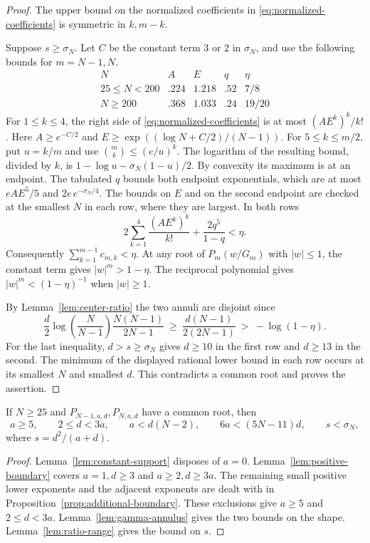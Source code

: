 \begin{proof}
The upper bound on the
normalized coefficients in \eqref{eq:normalized-coefficients}
is symmetric in \(k,m-k\).

Suppose \(s\ge\sigma_N\). Let \(C\) be the constant term \(3\) or \(2\)
in \(\sigma_N\), and use the following bounds for \(m=N-1,N\).
\[
\begin{array}{c|cccc}
 N&A&E&q&\eta\\ \hline
 25\le N<200&.224&1.218&.52&7/8\\
 N\ge200&.368&1.033&.24&19/20
\end{array}
\]
For \(1\le k\le4\), the right side of
\eqref{eq:normalized-coefficients} is at most
\((AE^k)^k/k!\). Here \(A\ge e^{-C/2}\) and
\(E\ge\exp((\log N+C/2)/(N-1))\).
For \(5\le k\le m/2\), put \(u=k/m\) and use
\(\binom mk\le(e/u)^k\). The logarithm of the resulting bound,
divided by \(k\), is \(1-\log u-\sigma_N(1-u)/2\).
By convexity its maximum is at an endpoint.
The tabulated \(q\) bounds both endpoint exponentials, which
are at most \(eAE^5/5\) and \(2e\,e^{-\sigma_N/4}\).
The bounds on \(E\) and on the second endpoint are checked
at the smallest \(N\) in each row, where they are largest.
In both rows
\[
 2\sum_{k=1}^{4}\frac{(AE^k)^k}{k!}+\frac{2q^5}{1-q}<\eta .
\]
Consequently \(\sum_{k=1}^{m-1}c_{m,k}<\eta\). At any root
of \(P_m(w/G_m)\) with \(|w|\le1\), the constant term gives
\(|w|^m>1-\eta\). The reciprocal polynomial gives
\(|w|^m<(1-\eta)^{-1}\) when \(|w|\ge1\).

By Lemma~\ref{lem:center-ratio} the two annuli are disjoint since
\[
 \frac d2\log\!\left(\frac N{N-1}\right)
              \frac{N(N-1)}{2N-1}
 \ \ge\ \frac{d(N-1)}{2(2N-1)}
 \ >\ -\log(1-\eta).
\]
For the last inequality, \(d>s\ge\sigma_N\) gives \(d\ge10\)
in the first row and \(d\ge13\) in the second. The minimum
of the displayed rational lower bound in each row occurs at
its smallest \(N\) and smallest \(d\). This contradicts
a common root and proves the assertion.
\end{proof}


\begin{lemma}
\label{lem:support-reduction}
If \(N\ge25\) and \(P_{N-1,a,d},P_{N,a,d}\) have a common root, then
\[
 a\ge5,\qquad 2\le d<3a,\qquad
 a<d(N-2),\qquad 6a<(5N-11)d,\qquad
 s<\sigma_N,
\]
where \(s=d^2/(a+d)\).
\end{lemma}

\begin{proof}
Lemma~\ref{lem:constant-support} disposes of \(a=0\).
Lemma~\ref{lem:positive-boundary} covers \(a=1,d\ge3\) and
\(a\ge2,d\ge3a\). The remaining small positive
lower exponents and the adjacent exponents are dealt with in
Proposition~\ref{prop:additional-boundary}. These exclusions give
\(a\ge5\) and \(2\le d<3a\). Lemma~\ref{lem:gamma-annulus} gives
the two bounds on the shape. Lemma~\ref{lem:ratio-range} gives the
bound on \(s\).
\end{proof}
